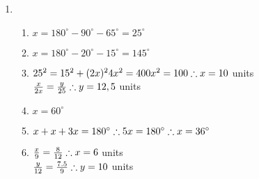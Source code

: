 \begin{eocsolutions}{}
{\begin{enumerate}[itemsep=5pt, label=\textbf{\arabic*}. ]
\begin{enumerate}[noitemsep, label=\textbf{(\alph*)} ]
\item False - a trapezium only has one pair of opposite parallel sides.%
\item True.%
\item True.%
\item False - two adjacent sides of a rhombus are equal in length.%
\item True.%
\item True.%
\item True.%
\item False - the diagonals of a rhombus are not equal in length.%
\item False - only one diagonal of a kite bisects two pairs of interior angles.%
	  \end{enumerate}
\item %
	  \begin{enumerate}[noitemsep, label=\textbf{(\alph*)} ]
	\item $x=180^{\circ}-90^{\circ}-65^{\circ}=25^{\circ}$
\item $x=180^{\circ}-20^{\circ}-15^{\circ}=145^{\circ}$
\item $25^2 = 15^2 + (2x)^2\\
4x^2 = 400\\
x^2 = 100\\
\therefore x=10$ units\\
$\frac{x}{2x} = \frac{y}{25}\\
\therefore y=12,5$ units
\item $x=60^{\circ}$
\item $x+x+3x = 180^{\circ}\\
\therefore 5x = 180^{\circ}\\ \therefore x=36^{\circ}$
\item $
\frac{x}{9} = \frac{8}{12}\\
\therefore x=6$ units\\
$\frac{y}{12} = \frac{7.5}{9} \\ 
\therefore y=10$ units
	  \end{enumerate}


\end{enumerate}}
\end{eocsolutions}
